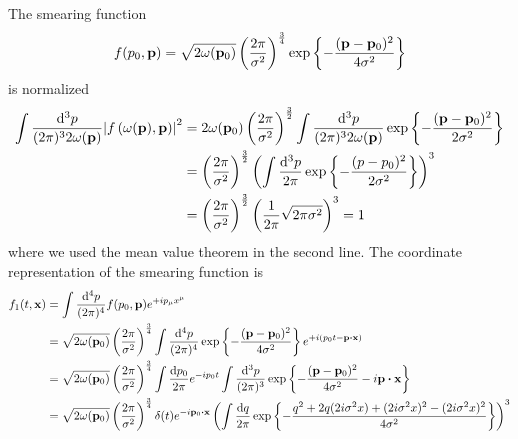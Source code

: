 \begin{example}
	The smearing function
	\begin{equation*}
		f(p_0,\vb{p})
		=
		\sqrt{2\omega(\vb{p}_0)}
		\left(\frac{2\pi}{\sigma^2}\right)^{\frac{3}{4}}
		\exp\left\{
			-
			\frac{(\vb{p}-\vb{p}_0)^2}{4\sigma^2}
		\right\}
	\end{equation*}
	is normalized
	\begin{equation*}
		\begin{split}
			\int\frac{\dd[3]{p}}{(2\pi)^32\omega(\vb{p})}
			\abs{f\left(\omega(\vb{p}),\vb{p}\right)}^2
			&=
			2\omega(\vb{p}_0)
			\left(\frac{2\pi}{\sigma^2}\right)^{\frac{3}{2}}
			\int\frac{\dd[3]{p}}{(2\pi)^32\omega(\vb{p})}
			\exp\left\{
				-
				\frac{(\vb{p}-\vb{p}_0)^2}{2\sigma^2}
			\right\}
			\\
			&=
			\left(\frac{2\pi}{\sigma^2}\right)^{\frac{3}{2}}
			\left(
				\int\frac{\dd[3]{p}}{2\pi}
				\exp\left\{
					-
					\frac{(p-p_0)^2}{2\sigma^2}
				\right\}
			\right)^3
			\\
			&=
			\left(\frac{2\pi}{\sigma^2}\right)^{\frac{3}{2}}
			\left(
				\frac{1}{2\pi}
				\sqrt{2\pi\sigma^2}
			\right)^3
			=
			1
		\end{split}
	\end{equation*}
	where we used the mean value theorem in the second line.
	The coordinate representation of the smearing function is
	\begin{equation*}
		\begin{split}
			f_1(t,\vb{x})
			&=
			\int\frac{\dd[4]{p}}{(2\pi)^4}
			f(p_0,\vb{p})
			e^{+ip_\mu x^\mu}
			\\
			&=
			\sqrt{2\omega(\vb{p}_0)}
			\left(\frac{2\pi}{\sigma^2}\right)^{\frac{3}{4}}
			\int\frac{\dd[4]{p}}{(2\pi)^4}
			\exp\left\{
				-
				\frac{(\vb{p}-\vb{p}_0)^2}{4\sigma^2}
			\right\}
			e^{+i(p_0t-\vb{p}\vdot\vb{x})}
			\\
			&=
			\sqrt{2\omega(\vb{p}_0)}
			\left(\frac{2\pi}{\sigma^2}\right)^{\frac{3}{4}}
			\int\frac{\dd{p_0}}{2\pi}
			e^{-ip_0t}
			\int\frac{\dd[3]{p}}{(2\pi)^3}
			\exp\left\{
				-
				\frac{(\vb{p}-\vb{p}_0)^2}{4\sigma^2}
				-
				i\vb{p}\vdot\vb{x}
			\right\}
			\\
			&=
			\sqrt{2\omega(\vb{p}_0)}
			\left(\frac{2\pi}{\sigma^2}\right)^{\frac{3}{4}}
			\delta(t)
			e^{-i\vb{p}_0\vdot\vb{x}}
			\left(
				\int\frac{\dd{q}}{2\pi}
				\exp\left\{
					-
					\frac{q^2+2q(2i\sigma^2x)+(2i\sigma^2x)^2-(2i\sigma^2x)^2}{4\sigma^2}
				\right\}
			\right)^3
			\\

\end{split}
\end{equation*}
\end{example}
